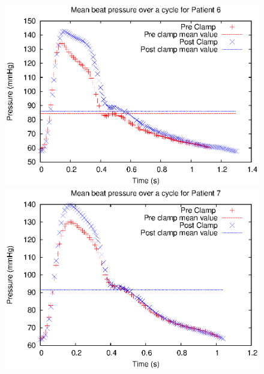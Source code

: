 \documentclass{config}
\begin{document}
\begin{figure}[H]
\begin{minipage}{0.48\textwidth}
\includegraphics[scale=0.66]{Figures/Patient6.eps}
\end{minipage}
\begin{minipage}{0.48\textwidth}
\includegraphics[scale=0.66]{Figures/Patient7.eps}
\end{minipage}


\end{figure}
\end{document}
